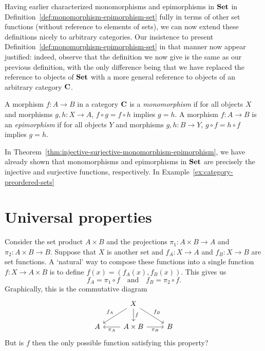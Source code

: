 \medskip

Having earlier characterized monomorphisms and epimorphisms in \(\mathbf{Set}\) in
Definition~\ref{def:monomorphism-epimorphism-set} fully in terms of other set
functions (without reference to elements of sets), we can now extend these
definitions nicely to arbitrary categories. Our insistence to present
Definition~\ref{def:monomorphism-epimorphism-set} in that manner now appear
justified: indeed, observe that the definition we now give is the same as our
previous definition, with the only difference being that we have replaced the
reference to objects of \(\mathbf{Set}\) with a more general reference to objects of an
arbitrary category \(\mathbf{C}\).

\begin{definition}
    \label{def:monomorphism-epimorphism-category}
    A morphism \(f: A \to B\) in a category \(\mathbf{C}\) is a
    \emph{monomorphism} if for all objects \(X\) and morphisms \(g, h: X \to
    A\), \(f \circ g = f \circ h\) implies \(g = h\). A morphism \(f: A \to B\)
    is an \emph{epimorphism} if for all objects \(Y\) and morphisms \(g, h: B
    \to Y\), \(g \circ f = h \circ f\) implies \(g = h\).
\end{definition}

In Theorem~\ref{thm:injective-surjective-monomorphism-epimorphism}, we have
already shown that monomorphisms and epimorphisms in \(\mathbf{Set}\) are precisely the
injective and surjective functions, respectively. In
Example~\ref{ex:category-preordered-sets}


\section{Universal properties}

Consider the set product \(A \times B\) and the projections \(\pi_1: A \times B
\to A\) and \(\pi_2: A \times B \to B\). Suppose that \(X\) is another set and
\(f_A : X \to A\) and \(f_B : X \to B\) are set functions. A `natural' way to
compose these functions into a single function \(f: X \to A \times B\) is to
define \(f(x) = (f_A(x), f_B(x))\). This gives us
\[
    f_A = \pi_1 \circ f \quad \text{and} \quad f_B = \pi_2 \circ f.
\]
Graphically, this is the commutative diagram
\begin{equation}
    \label{eq:set-product-universal-property}
    \begin{tikzcd}
        & X \arrow[ld, "f_A"'] \arrow[rd, "f_B"] \arrow[d, "f"] &   \\
      A & A \times B \arrow[r, "\pi_B"'] \arrow[l, "\pi_A"]     & B
      \end{tikzcd} 
\end{equation}
But is \(f\) then the only possible function satisfying this property?

